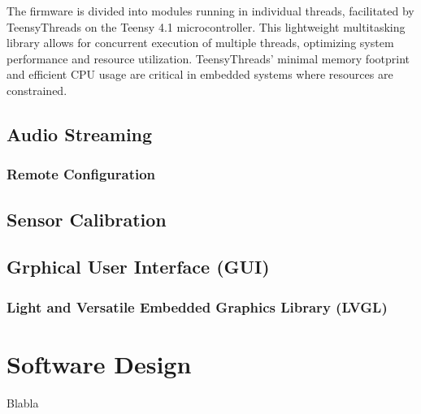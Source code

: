 The firmware is divided into modules running in individual threads, facilitated by TeensyThreads on the Teensy 4.1 microcontroller.
This lightweight multitasking library allows for concurrent execution of multiple threads, optimizing system performance and resource utilization.
TeensyThreads' minimal memory footprint and efficient CPU usage are critical in embedded systems where resources are constrained.




\subsection{Audio Streaming}

\subsubsection{Remote Configuration}

\subsection{Sensor Calibration}



\subsection{Grphical User Interface (GUI)}

\subsubsection{Light and Versatile Embedded Graphics Library (LVGL)}




\newpage
\section{Software Design}
Blabla




